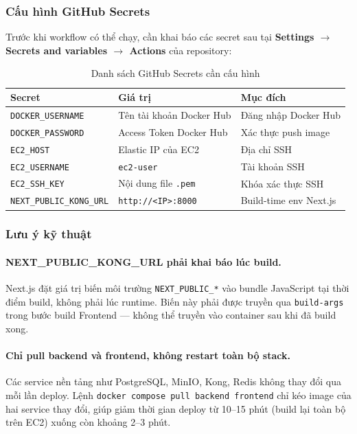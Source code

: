 \subsubsection{Cấu hình GitHub Secrets}

Trước khi workflow có thể chạy, cần khai báo các secret sau tại
\textbf{Settings $\to$ Secrets and variables $\to$ Actions} của repository:

\begin{table}[H]
\centering
\caption{Danh sách GitHub Secrets cần cấu hình}
\label{tab:github-secrets}
\begin{tabular}{lll}
\hline
\textbf{Secret} & \textbf{Giá trị} & \textbf{Mục đích} \\
\hline
\texttt{DOCKER\_USERNAME}        & Tên tài khoản Docker Hub    & Đăng nhập Docker Hub \\
\texttt{DOCKER\_PASSWORD}        & Access Token Docker Hub     & Xác thực push image \\
\texttt{EC2\_HOST}               & Elastic IP của EC2          & Địa chỉ SSH \\
\texttt{EC2\_USERNAME}           & \texttt{ec2-user}           & Tài khoản SSH \\
\texttt{EC2\_SSH\_KEY}           & Nội dung file \texttt{.pem} & Khóa xác thực SSH \\
\texttt{NEXT\_PUBLIC\_KONG\_URL} & \texttt{http://<IP>:8000}   & Build-time env Next.js \\
\hline
\end{tabular}
\end{table}

\subsubsection{Lưu ý kỹ thuật}

\paragraph{NEXT\_PUBLIC\_KONG\_URL phải khai báo lúc build.}
Next.js đặt giá trị biến môi trường
\texttt{NEXT\_PUBLIC\_*} vào bundle JavaScript tại thời điểm build,
không phải lúc runtime. Biến này phải được truyền qua \texttt{build-args}
trong bước build Frontend --- không thể truyền vào container sau khi đã
build xong.

\paragraph{Chỉ pull backend và frontend, không restart toàn bộ stack.}
Các service nền tảng như PostgreSQL, MinIO, Kong, Redis không thay đổi
qua mỗi lần deploy. Lệnh \texttt{docker compose pull backend frontend}
chỉ kéo image của hai service thay đổi, giúp giảm thời gian deploy từ
10--15 phút (build lại toàn bộ trên EC2) xuống còn khoảng 2--3 phút.

